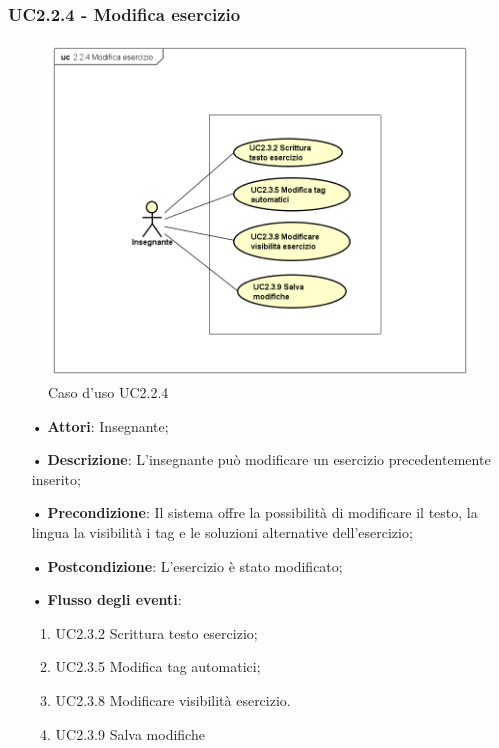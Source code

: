 \subsubsection{UC2.2.4 - Modifica esercizio}

\begin{figure}[H]
\centering
\includegraphics[width=17cm]{img/UC224.png} 
\caption{Caso d'uso UC2.2.4}
\end{figure}

\begin{itemize}
	\item[•] \textbf{Attori}: Insegnante;
	\item[•] \textbf{Descrizione}: L’insegnante può modificare un esercizio precedentemente inserito;
	\item[•] \textbf{Precondizione}: Il sistema offre la possibilità di modificare il testo, la
				lingua la visibilità i tag e le soluzioni alternative 
				dell’esercizio;
	\item[•] \textbf{Postcondizione}: L’esercizio è stato modificato;
	\item[•] \textbf{Flusso degli eventi}:
		\begin{enumerate}
			\item UC2.3.2 Scrittura testo esercizio;
			\item UC2.3.5 Modifica tag automatici;
			\item UC2.3.8 Modificare visibilità esercizio.
			\item UC2.3.9 Salva modifiche
		\end{enumerate}
		    
\end{itemize}   	
	
